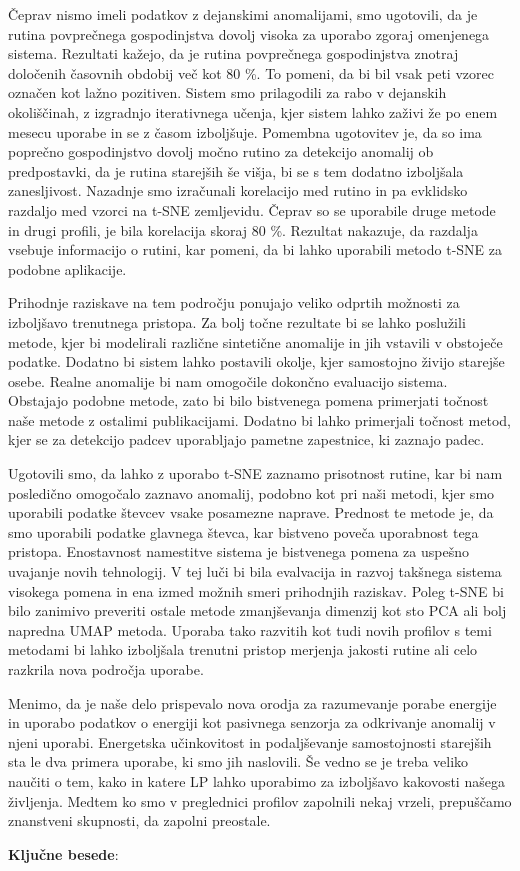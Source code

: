 \begin{sloabstract}
Čeprav nismo imeli podatkov z dejanskimi anomalijami, smo ugotovili, da je rutina povprečnega gospodinjstva dovolj visoka za uporabo zgoraj omenjenega sistema. Rezultati kažejo, da je rutina povprečnega gospodinjstva znotraj določenih časovnih obdobij več kot 80 \%. To pomeni, da bi bil vsak peti vzorec označen kot lažno pozitiven. Sistem smo prilagodili za rabo v dejanskih okoliščinah, z izgradnjo iterativnega učenja, kjer sistem lahko zaživi že po enem mesecu uporabe in se z časom izboljšuje. Pomembna ugotovitev je, da so ima poprečno gospodinjstvo dovolj močno rutino za detekcijo anomalij ob predpostavki, da je rutina starejših še višja, bi se s tem dodatno izboljšala zanesljivost. Nazadnje smo izračunali korelacijo med rutino in pa evklidsko razdaljo med vzorci na t-SNE zemljevidu. Čeprav so se uporabile druge metode in drugi profili, je bila korelacija skoraj 80 \%. Rezultat nakazuje, da razdalja vsebuje informacijo o rutini, kar pomeni, da bi lahko uporabili metodo t-SNE za podobne aplikacije.  

Prihodnje raziskave na tem področju ponujajo veliko odprtih možnosti za izboljšavo trenutnega pristopa. Za bolj točne rezultate bi se lahko poslužili metode, kjer bi modelirali različne sintetične anomalije in jih vstavili v obstoječe podatke. Dodatno bi sistem lahko postavili okolje, kjer samostojno živijo starejše osebe. Realne anomalije bi nam omogočile dokončno evaluacijo sistema. Obstajajo podobne metode, zato bi bilo bistvenega pomena primerjati točnost naše metode z ostalimi publikacijami. Dodatno bi lahko primerjali točnost metod, kjer se za detekcijo padcev uporabljajo pametne zapestnice, ki zaznajo padec.  

Ugotovili smo, da lahko z uporabo t-SNE zaznamo prisotnost rutine, kar bi nam posledično omogočalo zaznavo anomalij, podobno kot pri naši metodi, kjer smo uporabili podatke števcev vsake posamezne naprave. Prednost te metode je, da smo uporabili podatke glavnega števca, kar bistveno poveča uporabnost tega pristopa. Enostavnost namestitve sistema je bistvenega pomena za uspešno uvajanje novih tehnologij. V tej luči bi bila evalvacija in razvoj takšnega sistema visokega pomena in ena izmed možnih smeri prihodnjih raziskav. Poleg t-SNE bi bilo zanimivo preveriti ostale metode zmanjševanja dimenzij kot sto PCA ali bolj napredna UMAP metoda. Uporaba tako razvitih kot tudi novih profilov s temi metodami bi lahko izboljšala trenutni pristop merjenja jakosti rutine ali celo razkrila nova področja uporabe.  

Menimo, da je naše delo prispevalo nova orodja za razumevanje porabe energije in uporabo podatkov o energiji kot pasivnega senzorja za odkrivanje anomalij v njeni uporabi. Energetska učinkovitost in podaljševanje samostojnosti starejših sta le dva primera uporabe, ki smo jih naslovili. Še vedno se je treba veliko naučiti o tem, kako in katere LP lahko uporabimo za izboljšavo kakovosti našega življenja. Medtem ko smo v preglednici profilov zapolnili nekaj vrzeli, prepuščamo znanstveni skupnosti, da zapolni preostale.  


\par\textbf{Ključne besede}: \slokeywordnames 
  
  \end{sloabstract}